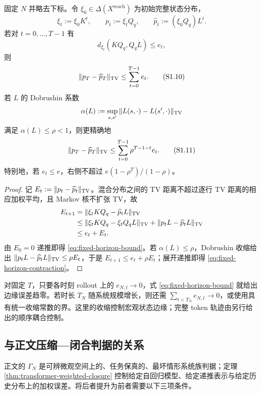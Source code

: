\begin{proposition}[固定时长的宏观状态边缘]
\label{prop:transformer-fixed-horizon}
固定 $N$ 并略去下标。令 $\xi_0\in\Delta(X^{\mathrm{reach}})$ 为初始完整状态分布，
\[
 \xi_t:=\xi_0K^t,
 \qquad p_t:=\xi_tQ_q,
 \qquad \widehat p_t:=(\xi_0Q_q)L^t.
\]
若对 $t=0,\ldots,T-1$ 有
\[
 d_{\xi_t}(KQ_q,Q_qL)\le e_t,
 \tag{\TransformerEquationPrefix.9}\label{eq:rollout-one-step}
\]
则
\[
 \|p_T-\widehat p_T\|_{\TV}
 \le\sum_{t=0}^{T-1}e_t.
 \tag{\TransformerEquationPrefix.10}\label{eq:fixed-horizon-bound}
\]
若 $L$ 的 Dobrushin 系数
\[
 \alpha(L):=\sup_{s,s'}\|L(s,\cdot)-L(s',\cdot)\|_{\operatorname{TV}}
\]
满足 $\alpha(L)\le\rho<1$，则更精确地
\[
 \|p_T-\widehat p_T\|_{\TV}
 \le\sum_{t=0}^{T-1}\rho^{T-1-t}e_t.
 \tag{\TransformerEquationPrefix.11}\label{eq:fixed-horizon-contraction}
\]
特别地，若 $e_t\le e$，右侧不超过
$e(1-\rho^T)/(1-\rho)$。
\end{proposition}

\begin{proof}
记 $E_t:=\|p_t-\widehat p_t\|_{\operatorname{TV}}$。混合分布之间的 TV 距离不超过逐行 TV 距离的相应加权平均，且 Markov 核不扩张 TV，故
\[
 \begin{aligned}
 E_{t+1}
 &=\|\xi_tKQ_q-\widehat p_tL\|_{\operatorname{TV}}\\
 &\le\|\xi_tKQ_q-\xi_tQ_qL\|_{\operatorname{TV}}
     +\|p_tL-\widehat p_tL\|_{\operatorname{TV}}\\
 &\le e_t+E_t.
 \end{aligned}
\]
由 $E_0=0$ 递推即得 \eqref{eq:fixed-horizon-bound}。若
$\alpha(L)\le\rho$，Dobrushin 收缩给出
$\|p_tL-\widehat p_tL\|_{\operatorname{TV}}\le\rho E_t$，于是
$E_{t+1}\le e_t+\rho E_t$；展开递推即得
\eqref{eq:fixed-horizon-contraction}。
\end{proof}

\begin{remark}[固定时长与增长时长]
对固定 $T$，只要各时刻 rollout 上的 $e_{N,t}\to0$，式
\eqref{eq:fixed-horizon-bound} 就给出边缘误差趋零。若时长 $T_N$ 随系统规模增长，则还需
$\sum_{t<T_N}e_{N,t}\to0$，或使用具有统一收缩常数的界。这里的收缩控制宏观状态边缘；完整 token 轨迹由另行给出的顺序耦合控制。
\end{remark}

\subsection{与正文压缩—闭合判据的关系}
\label{sec:transformer-gamma-relation}

正文的 $\Gamma_N$ 是可辨微观空间上的、任务保真的、最坏情形系统族判据；定理
\ref{thm:transformer-weighted-closure} 控制给定自回归模型、给定递推表示与给定历史分布上的加权误差。将后者提升为前者需要以下三项条件。

